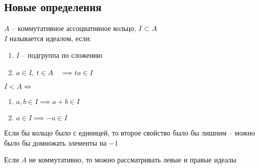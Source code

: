 \subsection{Новые определения}

\begin{definition}
	$ A $ -- коммутативное ассоциативное кольцо, $ I \subset A $ \\
	$ I $ называется идеалом, если:
	\begin{enumerate}
		\item $ I $ -- подгруппа по сложению
		\item $ a \in I, ~ t \in A \quad \implies ta \in I $
	\end{enumerate}
\end{definition}

\begin{remark}
	$ I < A \iff $
	\begin{enumerate}
		\item $ a, b \in I \implies a + b \in I $
		\item $ a \in I \implies -a \in I $
	\end{enumerate}
\end{remark}

\begin{remark}
	Если бы кольцо было с единицей, то второе свойство было бы лишним -- можно было бы домножать элементы на $ -1 $
\end{remark}

\begin{remark}
	Если $ A $ не коммутативно, то можно рассматривать левые и правые идеалы
\end{remark}


